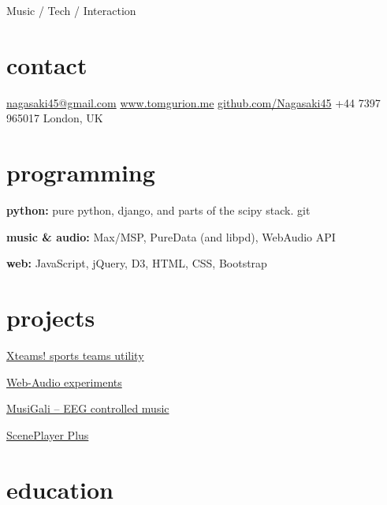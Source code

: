 \documentclass[]{friggeri-cv}  %
\begin{document}
       {Music / Tech / Interaction}


\begin{aside}

\section{contact}

\href{mailto:nagasaki45@gmail.com}{nagasaki45@gmail.com}
\href{http://www.tomgurion.me}{www.tomgurion.me}
\href{https://github.com/Nagasaki45}{github.com/Nagasaki45}
+44 7397 965017
London, UK

\section{programming}

\textbf{python:} pure python, django, and parts of the scipy stack. git

\textbf{music \& audio:} Max/MSP, PureData (and libpd), WebAudio API

\textbf{web:} JavaScript, jQuery, D3, HTML, CSS, Bootstrap

\section{projects}
\href{http://xteams.nagasaki45.com/}{Xteams! sports teams utility}

\href{http://web-audio.nagasaki45.com/}{Web-Audio experiments}

\href{http://www.tomgurion.me/musigali.html}{MusiGali -- EEG controlled music}

\href{https://github.com/Nagasaki45/ScenePlayer-Plus}{ScenePlayer Plus}

\end{aside}


\section{education}
\end{document}
